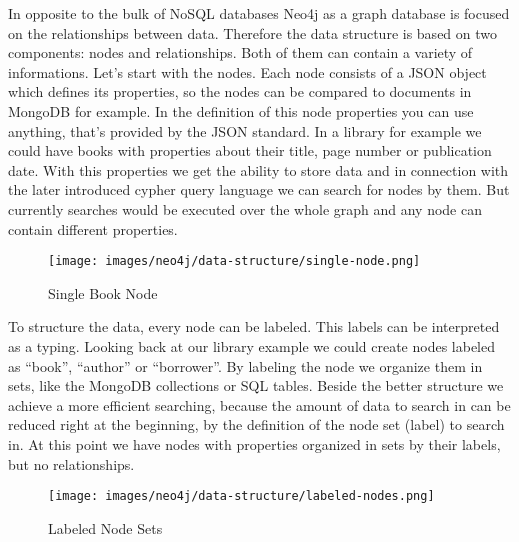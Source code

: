 In opposite to the bulk of NoSQL databases Neo4j as a graph database is focused on the relationships between data.
Therefore the data structure is based on two components: nodes and relationships. Both of them can contain a variety of informations.
Let's start with the nodes. Each node consists of a JSON object which defines its properties, so the nodes can be compared to documents in MongoDB for example. In the definition of this node properties you can use anything, that's provided by the JSON standard. In a library for example we could have books with properties about their title, page number or publication date.
With this properties we get the ability to store data and in connection with the later introduced cypher query language we can search for nodes by them. But currently searches would be executed over the whole graph and any node can contain different properties.
\cite["Nodes", para. 3]{NeoTechnologyInc.2017c} \cite[p. 80]{Gupta.2015} \cite[slide 20-21]{Hunger.2013}

\begin{figure}[H]
	\begin{center}
		\texttt{[image: images/neo4j/data-structure/single-node.png]}
		\caption{Single Book Node}
	\end{center}
\end{figure}

To structure the data, every node can be labeled. This labels can be interpreted as  a typing. Looking back at our library example we could create nodes labeled as “book”, “author” or “borrower”. By labeling the node we organize them in sets, like the MongoDB collections or SQL tables.
Beside the better structure we achieve a more efficient searching, because the amount of data to search in can be reduced right at the beginning, by the definition of the node set (label) to search in.
At this point we have nodes with properties organized in sets by their labels, but no relationships.
\cite["Labels", para. 2]{NeoTechnologyInc.2017c} \cite[slide 26-27]{Hunger.2013}

\begin{figure}[H]
	\begin{center}
			\texttt{[image: images/neo4j/data-structure/labeled-nodes.png]}
			\caption{Labeled Node Sets}
	\end{center}
\end{figure}


